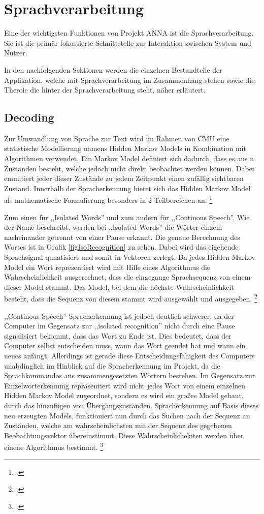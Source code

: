 \section{Sprachverarbeitung}
\label{languageProcessing}
Eine der wichtigsten Funktionen von Projekt \ac{ANNA} ist die Sprachverarbeitung. Sie ist die primär fokussierte Schnittstelle zur Interaktion zwischen System und Nutzer.

In den nachfolgenden Sektionen werden die einzelnen Bestandteile der Applikation, welche mit Sprachverarbeitung im Zusammenhang stehen sowie die Theroie die hinter der Sprachverarbeitung steht, näher erläutert.

\subsection{Decoding}
Zur Umwandlung von Sprache zur Text wird im Rahmen von \ac{CMU} eine statistische Modellierung namens Hidden Markov Models in Kombination mit Algorithmen verwendet. Ein Markov Model definiert sich dadurch, dass es aus n Zuständen besteht, welche jedoch nicht direkt beobachtet werden können. Dabei emmitiert jeder dieser Zustände zu jedem Zeitpunkt einen zufällig sichtbaren Zustand. Innerhalb der Spracherkennung bietet sich das Hidden Markov Model als mathematische Formulierung besonders in 2 Teilbereichen an. \footcite[vlg.:][S. 1 f.]{hmmIsolated}

Zum einen für ,,Isolated Words'' und zum andern für ,,Continous Speech''. Wie der Name beschreibt, werden bei ,,Isolated Words'' die Wörter einzeln nacheinander getrennt von einer Pause erkannt. Die genaue Berechnung des Wortes ist in Grafik \ref{figIsoRecognition} zu sehen. Dabei wird das eigehende Sprachsignal qunatisiert und somit in Vektoren zerlegt. Da jedes Hidden Markov Model ein Wort representiert wird mit Hilfe eines Algorithmus die Wahrscheinlichkeit ausgerechnet, dass die eingegange Sprachsequenz von einem dieser Model stammt. Das Model, bei dem die höchste Wahrscheinlichkeit besteht, dass die Sequenz von diesem stammt wird ausgewählt und ausgegeben.
\footcite[vlg.:][S. 12 f.]{hmmIsolated}

,,Continous Speech'' Spracherkennung ist jedoch deutlich schwerer, da der Computer im Gegensatz zur ,,isolated recognition'' nicht durch eine Pause signalisiert bekommt, dass das Wort zu Ende ist. Dies bedeutet, dass der Computer selbst entscheiden muss, wann das Wort geendet hat und wann ein neues anfängt. Allerdings ist gerade diese Entscheidungsfähigkeit des Computers unabdinglich im Hinblick auf die Spracherkennung im Projekt, da die Sprachkommandos aus zusammengesetzten Wörtern bestehen.
Im Gegensatz zur Einzelworterkennung repräsentiert wird nicht jedes Wort von einem einzelnen Hidden Markov Model zugeordnet, sondern es wird ein großes Model gebaut, durch das hinzufügen von Übergangszuständen. Spracherkennung auf Basis dieses neu erzeugten Models, funktioniert nun durch das Suchen nach der Sequenz an Zuständen, welche am wahrscheinlichsten mit der Sequenz des gegebenen Beobachtungsvektor übereinstimmt. Diese Wahrscheinlichekiten werden über einene Algorithmus bestimmt. 
\footcite[vlg.:][S. 29 f.]{hmmContinous}

